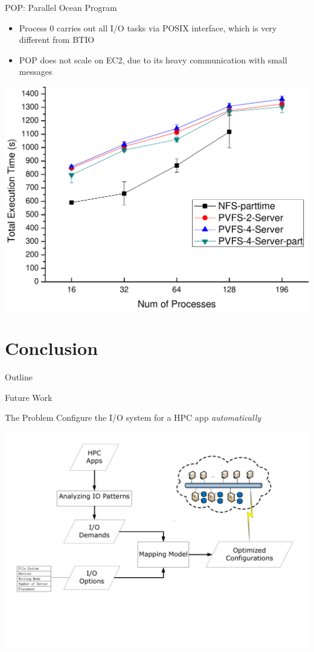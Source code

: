 \documentclass{beamer}
\begin{document}
\begin{frame}{POP: Parallel Ocean Program}
    \begin{itemize}
        \item Process 0 carries out all I/O tasks via POSIX interface, which
            is very different from BTIO
        \item POP does not scale on EC2, due to its heavy communication with
            small messages
    \end{itemize}
    \begin{center}
        \includegraphics[width=.5\textwidth]{figures/pop}
    \end{center}
\end{frame}

\section{Conclusion}
\begin{frame}{Outline}
    \tableofcontents[current]
\end{frame}

\begin{frame}{Future Work}
    \begin{block}{The Problem}
        Configure the I/O system for a HPC app \emph{automatically}
    \end{block}
    \begin{center}
        \includegraphics[width=.9\textwidth]{figures/visio/future.pdf}
    \end{center}
\end{frame}
\end{document}
